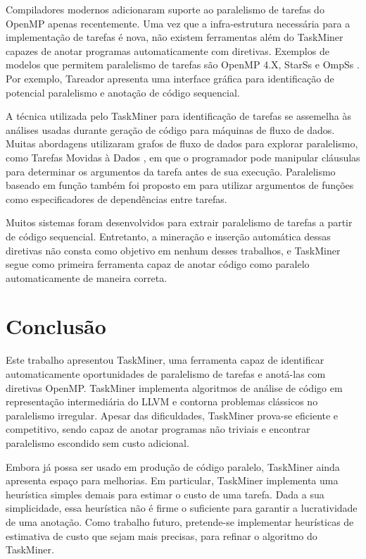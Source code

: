 \documentclass[sigplan,10pt,review]{acmart}
\newcommand\Taskminer{\mbox{\textsf{TaskMiner}}}
\begin{document}
Compiladores modernos adicionaram suporte ao paralelismo de tarefas 
do OpenMP apenas recentemente. 
Uma vez que a infra-estrutura necessária para
a implementação de tarefas é nova, não existem ferramentas 
além do {\Taskminer} capazes de anotar programas
automaticamente com diretivas. Exemplos
de modelos que permitem paralelismo de tarefas são OpenMP 4.X,
StarSs \cite{planas:hpca:2009} e OmpSs \cite{duran:ppl:2011}.
Por exemplo, Tareador \cite{Ayguade15} apresenta uma interface gráfica para identificação de potencial paralelismo e anotação de código sequencial.

A técnica utilizada pelo {\Taskminer} para identificação de tarefas se assemelha às análises usadas durante
geração de código para máquinas de fluxo de dados. Muitas abordagens utilizaram grafos
de fluxo de dados para explorar paralelismo, como Tarefas Movidas à Dados \cite{tasirlar:icpp:2011},
em que o programador pode manipular cláusulas para determinar os argumentos da tarefa
antes de sua execução. Paralelismo baseado em função também foi proposto em \cite{gupta:micro:2011}
para utilizar argumentos de funções como especificadores de dependências entre tarefas.

Muitos sistemas foram desenvolvidos para extrair paralelismo de tarefas a partir de código sequencial.
Entretanto, a mineração e inserção automática dessas diretivas não consta como objetivo
em nenhum desses trabalhos, e \Taskminer{} segue como primeira ferramenta capaz 
de anotar código como paralelo
automaticamente de maneira correta.



\section{Conclus\~{a}o}
\label{sec:conc}

Este trabalho apresentou \Taskminer{}, uma ferramenta capaz de identificar automaticamente oportunidades de paralelismo de tarefas e anotá-las com diretivas OpenMP. \Taskminer{} implementa algoritmos de análise de código em representação intermediária do LLVM e contorna problemas clássicos no paralelismo irregular. Apesar das dificuldades, \Taskminer{} prova-se eficiente e competitivo, sendo capaz de anotar programas não triviais e encontrar paralelismo escondido sem custo adicional. 

Embora já possa ser usado em produção de código paralelo, \Taskminer{} ainda apresenta espaço
para melhorias.
Em particular, \Taskminer{} implementa uma heurística simples demais para estimar o custo de uma tarefa.
Dada a sua simplicidade, essa heurística não é firme o suficiente para garantir a lucratividade de uma anotação. Como trabalho futuro, pretende-se implementar heurísticas de estimativa de custo que sejam mais precisas, para refinar o algoritmo do \Taskminer{}.


\end{document}
